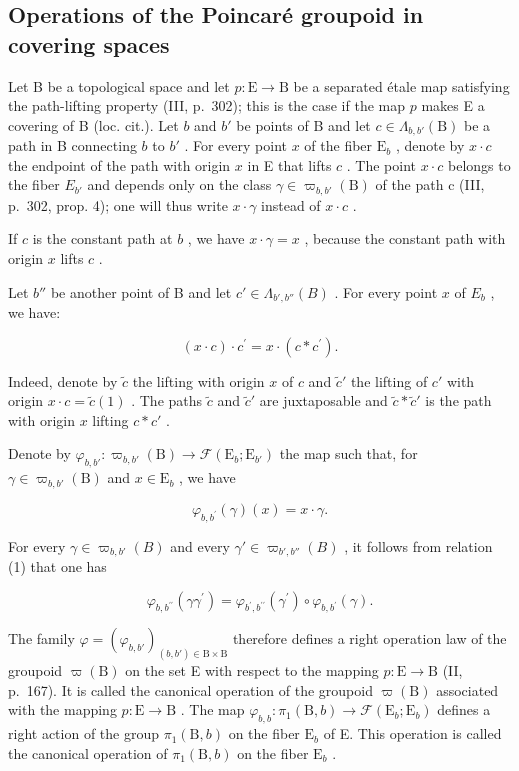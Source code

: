 \subsection{Operations of the Poincaré groupoid in covering spaces}

Let B be a topological space and let \(p \colon \mathrm{E} \to \mathrm{B}\) be a separated étale map satisfying the path-lifting property (III, p.~302); this is the case if the map \(p\) makes E a covering of B (loc. cit.). Let \(b\) and \(b'\) be points of B and let \(c \in \Lambda_{b,b'}(\mathrm{B})\) be a path in B connecting \(b\) to \(b'\) . For every point \(x\) of the fiber \(\mathrm{E}_b\) , denote by \(x \cdot c\) the endpoint of the path with origin \(x\) in E that lifts \(c\) . The point \(x \cdot c\) belongs to the fiber \(E_{b'}\) and depends only on the class \(\gamma \in \varpi_{b,b'}(\mathrm{B})\) of the path c (III, p.~302, prop. 4); one will thus write \(x \cdot \gamma\) instead of \(x \cdot c\) .

If \(c\) is the constant path at \(b\) , we have \(x \cdot \gamma = x\) , because the constant path with origin \(x\) lifts \(c\) .

Let \(b''\) be another point of B and let \(c' \in \Lambda_{b',b''}(B)\) . For every point \(x\) of \(E_b\) , we have:

\[
(x \cdot c) \cdot c ^ {\prime} = x \cdot (c * c ^ {\prime}).\tag{1}
\]

Indeed, denote by \(\widetilde{c}\) the lifting with origin \(x\) of \(c\) and \(\widetilde{c}'\) the lifting of \(c'\) with origin \(x \cdot c = \widetilde{c}(1)\) . The paths \(\widetilde{c}\) and \(\widetilde{c}'\) are juxtaposable and \(\widetilde{c} * \widetilde{c}'\) is the path with origin \(x\) lifting \(c * c'\) .

Denote by \(\varphi_{b,b'}\colon \varpi_{b,b'}(\mathrm{B})\to \mathcal{F}(\mathrm{E}_b;\mathrm{E}_{b'})\) the map such that, for \(\gamma \in \varpi_{b,b'}(\mathrm{B})\) and \(x\in \mathrm{E}_b\) , we have

\[
\varphi_ {b, b ^ {\prime}} (\gamma) (x) = x \cdot \gamma .
\]

For every \(\gamma \in \varpi_{b,b'}(B)\) and every \(\gamma' \in \varpi_{b',b''}(B)\) , it follows from relation (1) that one has

\[
\varphi_ {b, b ^ {\prime \prime}} (\gamma \gamma^ {\prime}) = \varphi_ {b ^ {\prime}, b ^ {\prime \prime}} (\gamma^ {\prime}) \circ \varphi_ {b, b ^ {\prime}} (\gamma).\tag{2}
\]

The family \(\varphi = (\varphi_{b,b'})_{(b,b')\in\mathrm{B}\times\mathrm{B}}\) therefore defines a right operation law of the groupoid \(\varpi(\mathrm{B})\) on the set E with respect to the mapping \(p\colon\mathrm{E}\to\mathrm{B}\) (II, p.~167). It is called the canonical operation of the groupoid \(\varpi(\mathrm{B})\) associated with the mapping \(p\colon\mathrm{E}\to\mathrm{B}\) . The map \(\varphi_{b,b}\colon\pi_{1}(\mathrm{B},b)\to\mathcal{F}(\mathrm{E}_{b};\mathrm{E}_{b})\) defines a right action of the group \(\pi_{1}(\mathrm{B},b)\) on the fiber \(\mathrm{E}_{b}\) of E. This operation is called the canonical operation of \(\pi_{1}(\mathrm{B},b)\) on the fiber \(\mathrm{E}_{b}\) .

